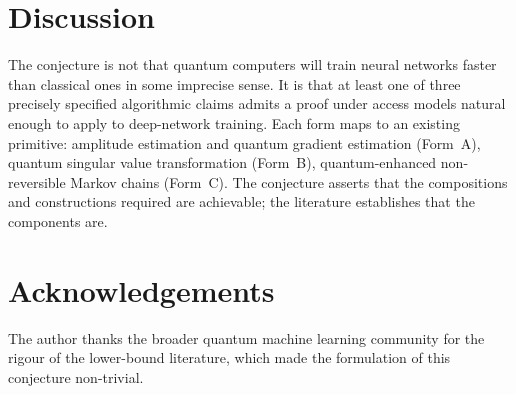 \documentclass[11pt,a4paper]{article}
\theoremstyle{definition}
\begin{document}
\section{Discussion}\label{sec:discussion}

The conjecture is not that quantum computers will train neural networks faster than classical ones in some imprecise sense. It is that at least one of three precisely specified algorithmic claims admits a proof under access models natural enough to apply to deep-network training. Each form maps to an existing primitive: amplitude estimation and quantum gradient estimation (Form~A), quantum singular value transformation (Form~B), quantum-enhanced non-reversible Markov chains (Form~C). The conjecture asserts that the compositions and constructions required are achievable; the literature establishes that the components are.

\section*{Acknowledgements}

The author thanks the broader quantum machine learning community for the rigour of the lower-bound literature, which made the formulation of this conjecture non-trivial.
\end{document}
